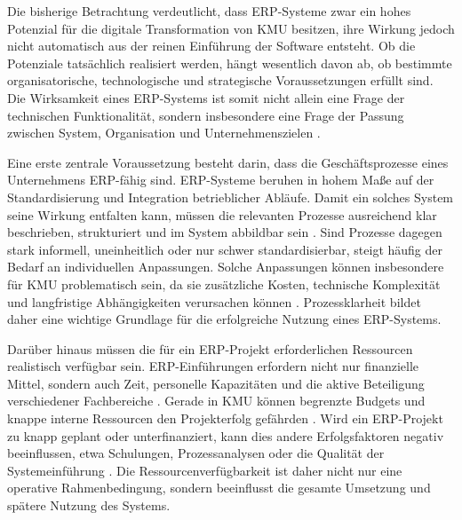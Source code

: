\iffalse

Die bisherige Betrachtung verdeutlicht, dass ERP-Systeme zwar ein hohes Potenzial für die digitale Transformation von 
KMU besitzen, ihre Wirkung jedoch nicht automatisch aus der reinen Einführung der Software entsteht. Ob die Potenziale tatsächlich realisiert 
werden, hängt wesentlich davon ab, ob bestimmte organisatorische, technologische und strategische Voraussetzungen 
erfüllt sind. Die Wirksamkeit eines ERP-Systems ist somit nicht allein eine Frage der technischen Funktionalität, 
sondern insbesondere eine Frage der Passung zwischen System, Organisation und Unternehmenszielen \parencite{Leyh2015,Alaskari2021,Leyh2019}.

Eine erste zentrale Voraussetzung besteht darin, dass die Geschäftsprozesse eines Unternehmens ERP-fähig sind. 
ERP-Systeme beruhen in hohem Maße auf der Standardisierung und Integration betrieblicher Abläufe. Damit ein solches 
System seine Wirkung entfalten kann, müssen die relevanten Prozesse ausreichend klar beschrieben, strukturiert und 
im System abbildbar sein \parencite{Leyh2019}. Sind Prozesse dagegen stark informell, uneinheitlich oder nur schwer standardisierbar, 
steigt häufig der Bedarf an individuellen Anpassungen. Solche Anpassungen können insbesondere für KMU problematisch 
sein, da sie zusätzliche Kosten, technische Komplexität und langfristige Abhängigkeiten verursachen können 
\parencite{Leyh2015}. Prozessklarheit bildet daher eine wichtige Grundlage für die erfolgreiche Nutzung eines ERP-Systems.


Darüber hinaus müssen die für ein ERP-Projekt erforderlichen Ressourcen realistisch verfügbar sein. ERP-Einführungen 
erfordern nicht nur finanzielle Mittel, sondern auch Zeit, personelle Kapazitäten und die aktive Beteiligung 
verschiedener Fachbereiche \parencite{Alaskari2021}. Gerade in KMU können begrenzte Budgets und knappe interne Ressourcen den Projekterfolg 
gefährden \parencite{Leyh2015}. Wird ein ERP-Projekt zu knapp geplant oder unterfinanziert, kann dies andere Erfolgsfaktoren negativ 
beeinflussen, etwa Schulungen, Prozessanalysen oder die Qualität der Systemeinführung \parencite{Xia2009,Barbieri2025}. 
Die Ressourcenverfügbarkeit ist daher nicht nur eine operative Rahmenbedingung, sondern beeinflusst die gesamte Umsetzung 
und spätere Nutzung des Systems.

